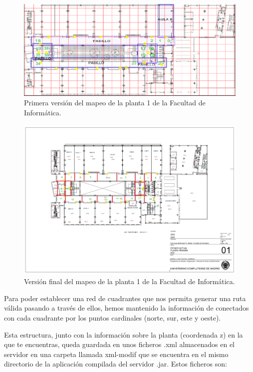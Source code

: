 \begin{figure}[t]
	\centering
	\includegraphics[width=1\textwidth]{Imagenes/Descripciondeltrabajo/mapaplanta1_cuadrantes}
	\caption{Primera versión del mapeo de la planta 1 de la Facultad de Informática.}
	\label{fig:cuadrantesP1_v1}
\end{figure}

\begin{figure}[t]
	\centering
	\includegraphics[width=1\textwidth]{Imagenes/Descripciondeltrabajo/mapaplanta1_cuadrantes3}
	\caption{Versión final del mapeo de la planta 1 de la Facultad de Informática.}
	\label{fig:cuadrantesP1_v3}
\end{figure}

Para poder establecer una red de cuadrantes que nos permita generar una ruta válida pasando a través de ellos, hemos mantenido la información de conectados con cada cuadrante por los puntos cardinales (norte, sur, este y oeste).

Esta estructura, junto con la información sobre la planta (coordenada z) en la que te encuentras, queda guardada en unos ficheros .xml almacenados en el servidor en una carpeta llamada xml-modif que se encuentra en el mismo directorio de la aplicación compilada del servidor .jar. Estos ficheros son:

